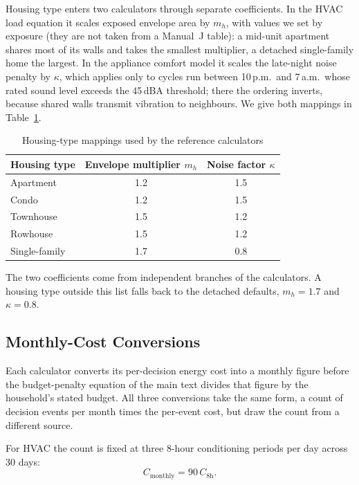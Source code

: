 \documentclass[11pt]{article}
\begin{document}
Housing type enters two calculators through separate coefficients. In the HVAC load equation it scales exposed envelope area by $m_h$, with values we set by exposure (they are not taken from a Manual~J table): a mid-unit apartment shares most of its walls and takes the smallest multiplier, a detached single-family home the largest. In the appliance comfort model it scales the late-night noise penalty by $\kappa$, which applies only to cycles run between 10\,p.m.\ and 7\,a.m.\ whose rated sound level exceeds the 45\,dBA threshold; there the ordering inverts, because shared walls transmit vibration to neighbours. We give both mappings in Table~\ref{tab:housing_mappings}.

\begin{table}[htbp]
\centering
\caption{Housing-type mappings used by the reference calculators}
\label{tab:housing_mappings}
\begin{tabular}{@{}lcc@{}}
\toprule
Housing type & Envelope multiplier $m_h$ & Noise factor $\kappa$ \\
\midrule
Apartment     & 1.2 & 1.5 \\
Condo         & 1.2 & 1.5 \\
Townhouse     & 1.5 & 1.2 \\
Rowhouse      & 1.5 & 1.2 \\
Single-family & 1.7 & 0.8 \\
\bottomrule
\end{tabular}
\end{table}

The two coefficients come from independent branches of the calculators. A housing type outside this list falls back to the detached defaults, $m_h = 1.7$ and $\kappa = 0.8$.

\subsection{Monthly-Cost Conversions}
\label{app:monthly_cost}

Each calculator converts its per-decision energy cost into a monthly figure before the budget-penalty equation of the main text divides that figure by the household's stated budget. All three conversions take the same form, a count of decision events per month times the per-event cost, but draw the count from a different source.

For HVAC the count is fixed at three 8-hour conditioning periods per day across 30 days:
\begin{equation}
C_{\mathrm{monthly}} = 90\,C_{\mathrm{8h}}.
\end{equation}
\end{document}
